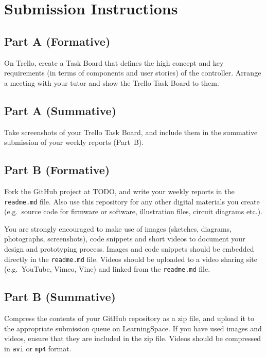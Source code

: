 \documentclass{../fal_assignment}
\begin{document}
\section*{Submission Instructions}

\subsection*{Part A (Formative)}

On Trello, create a Task Board that defines the high concept and key requirements (in terms of components and user stories) of the controller. Arrange a meeting with your tutor and show the Trello Task Board to them.

\subsection*{Part A (Summative)}

Take screenshots of your Trello Task Board, and include them in the summative submission
of your weekly reports (Part~B).

\subsection*{Part B (Formative)}

Fork the GitHub project at TODO, and write your weekly reports in the \texttt{readme.md} file.
Also use this repository for any other digital materials you create
(e.g.\ source code for firmware or software, illustration files, circuit diagrams etc.).

You are strongly encouraged to make use of images (sketches, diagrams, photographs, screenshots),
code snippets and short videos to document your design and prototyping process.
Images and code snippets should be embedded directly in the \texttt{readme.md} file.
Videos should be uploaded to a video sharing site (e.g.\ YouTube, Vimeo, Vine)
and linked from the \texttt{readme.md} file.

\subsection*{Part B (Summative)}

Compress the contents of your GitHub repository as a zip file,
and upload it to the appropriate submission queue on LearningSpace.
If you have used images and videos, ensure that they are included in the zip file.
Videos should be compressed in \texttt{avi} or \texttt{mp4} format.
\end{document}
